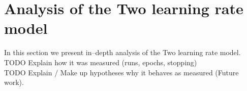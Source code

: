 
\section{Analysis of the Two learning rate model} 
\label{sec:analysis}
\label{sec:results} 

In this section we present in--depth analysis of the Two learning rate model.  
TODO Explain how it was measured (runs, epochs, stopping) \\
TODO Explain / Make up hypotheses why it behaves as measured (Future work). \\

 

 

 

 

 




